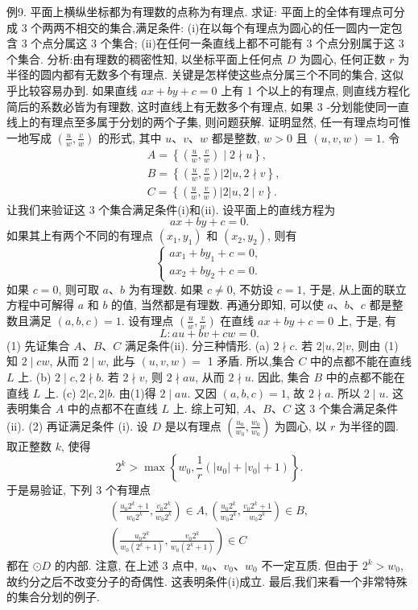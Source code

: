 例9. 平面上横纵坐标都为有理数的点称为有理点.
求证: 平面上的全体有理点可分成 3 个两两不相交的集合,满足条件:
(i)在以每个有理点为圆心的任一圆内一定包含 3 个点分属这 3 个集合;
(ii)在任何一条直线上都不可能有 3 个点分别属于这 3 个集合.
分析:由有理数的稠密性知, 以坐标平面上任何点 $D$ 为圆心, 任何正数 $r$ 为半径的圆内都有无数多个有理点.
关键是怎样使这些点分属三个不同的集合, 这似乎比较容易办到.
如果直线 $a x+b y+c=0$ 上有 1 个以上的有理点, 则直线方程化简后的系数必皆为有理数, 这时直线上有无数多个有理点, 如果 3 -分划能使同一直线上的有理点至多属于分划的两个子集, 则问题获解.
证明显然, 任一有理点均可惟一地写成 $\left(\frac{u}{w}, \frac{v}{w}\right)$ 的形式, 其中 $u 、 v 、 w$ 都是整数, $w>0$ 且 $(u, v, w)=1$.
令
$$
\begin{aligned}
& A=\left\{\left(\frac{u}{w}, \frac{v}{w}\right) \mid 2 \nmid u\right\}, \\
& B=\left\{\left(\frac{u}{w}, \frac{v}{w}\right)|2| u, 2 \nmid v\right\}, \\
& C=\left\{\left(\frac{u}{w}, \frac{v}{w}\right)|2| u, 2 \mid v\right\} .
\end{aligned}
$$
让我们来验证这 3 个集合满足条件(i)和(ii).
设平面上的直线方程为
$$
a x+b y+c=0 .
$$
如果其上有两个不同的有理点 $\left(x_1, y_1\right)$ 和 $\left(x_2, y_2\right)$, 则有
$$
\left\{\begin{array}{l}
a x_1+b y_1+c=0, \\
a x_2+b y_2+c=0 .
\end{array}\right.
$$
如果 $c=0$, 则可取 $a 、 b$ 为有理数.
如果 $c \neq 0$, 不妨设 $c=1$, 于是, 从上面的联立方程中可解得 $a$ 和 $b$ 的值, 当然都是有理数.
再通分即知, 可以使 $a 、 b 、 c$ 都是整数且满足 $(a, b, c)=1$.
设有理点 $\left(\frac{u}{w}, \frac{v}{w}\right)$ 在直线 $a x+b y+c=0$ 上, 于是, 有
$$
L: a u+b v+c w=0 .
$$
(1) 先证集合 $A 、 B 、 C$ 满足条件(ii). 分三种情形.
(a) $2 \nmid c$. 若 $2|u, 2| v$, 则由 (1) 知 $2 \mid c w$, 从而 $2 \mid w$, 此与 $(u, v, w)=$ 1 矛盾.
所以,集合 $C$ 中的点都不能在直线 $L$ 上.
(b) $2 \mid c, 2 \nmid b$. 若 $2 \nmid v$, 则 $2 \nmid a u$, 从而 $2 \nmid u$. 因此, 集合 $B$ 中的点都不能在直线 $L$ 上.
(c) $2|c, 2| b$. 由(1)得 $2 \mid a u$. 又因 $(a, b, c)=1$, 故 $2 \nmid a$. 所以 $2 \mid u$. 这表明集合 $A$ 中的点都不在直线 $L$ 上.
综上可知, $A 、 B 、 C$ 这 3 个集合满足条件(ii).
(2) 再证满足条件 (i).
设 $D$ 是以有理点 $\left(\frac{u_0}{w_0}, \frac{w_0}{w_0}\right)$ 为圆心, 以 $r$ 为半径的圆.
取正整数 $k$, 使得
$$
2^k>\max \left\{w_0, \frac{1}{r}\left(\left|u_0\right|+\left|v_0\right|+1\right)\right\} .
$$
于是易验证, 下列 3 个有理点
$$
\begin{gathered}
\left(\frac{u_0 2^k+1}{w_0 2^k}, \frac{v_0 2^k}{w_0 2^k}\right) \in A,\left(\frac{u_0 2^k}{w_0 2^k}, \frac{v_0 2^k+1}{w_0 2^k}\right) \in B, \\
\left(\frac{u_0 2^k}{w_0\left(2^k+1\right)}, \frac{v_0 2^k}{w_0\left(2^k+1\right)}\right) \in C
\end{gathered}
$$
都在 $\odot D$ 的内部.
注意, 在上述 3 点中, $u_0 、 v_0 、 w_0$ 不一定互质.
但由于 $2^k> w_0$, 故约分之后不改变分子的奇偶性.
这表明条件(i)成立.
最后,我们来看一个非常特殊的集合分划的例子.



